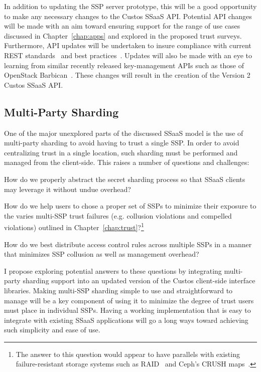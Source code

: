 In addition to updating the SSP server prototype, this will be a good
opportunity to make any necessary changes to the Custos SSaaS
API. Potential API changes will be made with an aim toward ensuring
support for the range of use cases discussed in
Chapter~\ref{chap:apps} and explored in the proposed trust surveys.
Furthermore, API updates will be undertaken to insure compliance with
current REST standards~\cite{ibm-restful} and best
practices~\cite{rest-bestpractices}. Updates will also be made with an
eye to learning from similar recently released key-management APIs
such as those of OpenStack Barbican~\cite{openstack-barbican}. These
changes will result in the creation of the Version 2 Custos SSaaS API.

\subsection{Multi-Party Sharding}

One of the major unexplored parts of the discussed SSaaS model is the
use of multi-party sharding to avoid having to trust a single SSP. In
order to avoid centralizing trust in a single location, such sharding
must be performed and managed from the client-side. This raises a
number of questions and challenges:

\begin{packed_item}
\item How do we properly abstract the secret sharding process so that
  SSaaS clients may leverage it without undue overhead?
\item How do we help users to chose a proper set of SSPs to minimize
  their exposure to the varies multi-SSP trust failures
  (e.g. collusion violations and compelled violations) outlined in
  Chapter~\ref{chap:trust}?\footnote{The answer to this question would
    appear to have parallels with existing failure-resistant storage
    systems such as RAID~\cite{patterson1988} and Ceph's CRUSH
    maps~\cite{ceph-crush}.}
\item How do we best distribute access control rules across multiple
  SSPs in a manner that minimizes SSP collusion as well as management
  overhead?
\end{packed_item}

I propose exploring potential answers to these questions by
integrating multi-party sharding support into an updated version of
the Custos client-side interface libraries. Making multi-SSP sharding
simple to use and straightforward to manage will be a key component of
using it to minimize the degree of trust users must place in
individual SSPs. Having a working implementation that is easy to
integrate with existing SSaaS applications will go a long ways toward
achieving such simplicity and ease of use.


